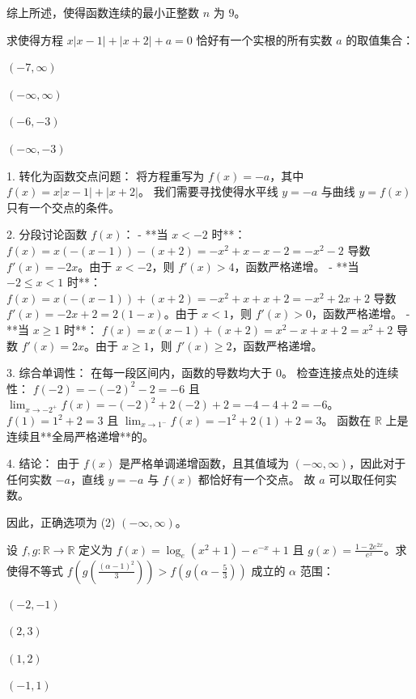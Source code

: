 \begin{questions}
\begin{solution}
    综上所述，使得函数连续的最小正整数 $n$ 为 $9$。
\end{solution}

\question 
求使得方程 $x|x - 1| + |x + 2| + a = 0$ 恰好有一个实根的所有实数 $a$ 的取值集合：
\begin{choices}
    \item $(-7, \infty)$
    \item $(-\infty, \infty)$
    \item $(-6, -3)$
    \item $(-\infty, -3)$
\end{choices}

\begin{solution}
1. 转化为函数交点问题：
将方程重写为 $f(x) = -a$，其中 $f(x) = x|x - 1| + |x + 2|$。
我们需要寻找使得水平线 $y = -a$ 与曲线 $y = f(x)$ 只有一个交点的条件。

2. 分段讨论函数 $f(x)$：
- **当 $x < -2$ 时**：
  $f(x) = x(-(x - 1)) - (x + 2) = -x^2 + x - x - 2 = -x^2 - 2$
  导数 $f'(x) = -2x$。由于 $x < -2$，则 $f'(x) > 4$，函数严格递增。
- **当 $-2 \leq x < 1$ 时**：
  $f(x) = x(-(x - 1)) + (x + 2) = -x^2 + x + x + 2 = -x^2 + 2x + 2$
  导数 $f'(x) = -2x + 2 = 2(1 - x)$。由于 $x < 1$，则 $f'(x) > 0$，函数严格递增。
- **当 $x \geq 1$ 时**：
  $f(x) = x(x - 1) + (x + 2) = x^2 - x + x + 2 = x^2 + 2$
  导数 $f'(x) = 2x$。由于 $x \geq 1$，则 $f'(x) \geq 2$，函数严格递增。

3. 综合单调性：
在每一段区间内，函数的导数均大于 0。
检查连接点处的连续性：
$f(-2) = -(-2)^2 - 2 = -6$ 且 $\lim_{x \to -2^+} f(x) = -(-2)^2 + 2(-2) + 2 = -4 - 4 + 2 = -6$。
$f(1) = 1^2 + 2 = 3$ 且 $\lim_{x \to 1^-} f(x) = -1^2 + 2(1) + 2 = 3$。
函数在 $\mathbb{R}$ 上是连续且**全局严格递增**的。


4. 结论：
由于 $f(x)$ 是严格单调递增函数，且其值域为 $(-\infty, \infty)$，因此对于任何实数 $-a$，直线 $y = -a$ 与 $f(x)$ 都恰好有一个交点。
故 $a$ 可以取任何实数。

因此，正确选项为 (2) $(-\infty, \infty)$。
\end{solution}

\question 
设 $f, g: \mathbb{R} \to \mathbb{R}$ 定义为 $f(x) = \log_e(x^2 + 1) - e^{-x} + 1$ 且 $g(x) = \frac{1 - 2e^{2x}}{e^x}$。求使得不等式 $f(g(\frac{(\alpha-1)^2}{3})) > f(g(\alpha - \frac{5}{3}))$ 成立的 $\alpha$ 范围：
\begin{choices}
    \item $(-2, -1)$
    \item $(2, 3)$
    \item $(1, 2)$
    \item $(-1, 1)$
\end{choices}


\end{questions}
